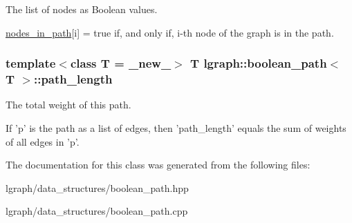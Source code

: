 The list of nodes as Boolean values. 

\hyperlink{classlgraph_1_1boolean__path_a0ea5d4c5f7e445270bb5c0346ec7c150}{nodes\-\_\-in\-\_\-path}\mbox{[}i\mbox{]} = true if, and only if, i-\/th node of the graph is in the path. \hypertarget{classlgraph_1_1boolean__path_ab298ac156fd7d73e21769fd30b2c5ad1}{
\subsubsection[{path\-\_\-length}]{\setlength{\rightskip}{0pt plus 5cm}template$<$class T = \-\_\-new\-\_\-$>$ T {\bf lgraph\-::boolean\-\_\-path}$<$ T $>$\-::path\-\_\-length\hspace{0.3cm}{\ttfamily [private]}}}\label{classlgraph_1_1boolean__path_ab298ac156fd7d73e21769fd30b2c5ad1}


The total weight of this path. 

If 'p' is the path as a list of edges, then 'path\-\_\-length' equals the sum of weights of all edges in 'p'. 

The documentation for this class was generated from the following files\-:\begin{DoxyCompactItemize}
\item 
lgraph/data\-\_\-structures/boolean\-\_\-path.\-hpp\item 
lgraph/data\-\_\-structures/boolean\-\_\-path.\-cpp\end{DoxyCompactItemize}
